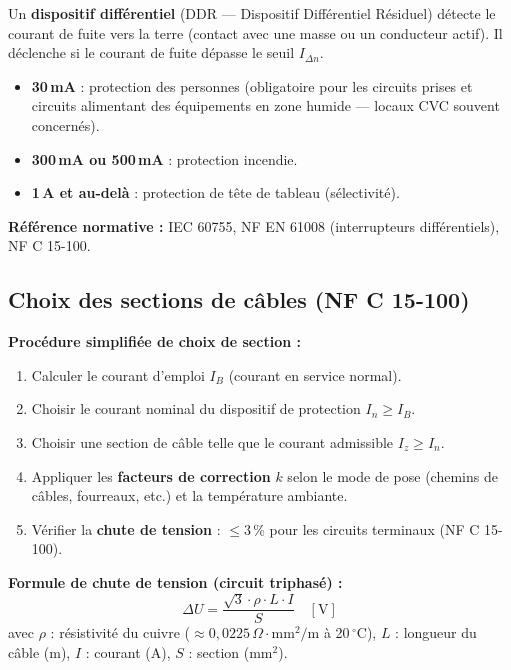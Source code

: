 \begin{definition}
  Un \textbf{dispositif différentiel} (DDR — Dispositif Différentiel Résiduel) détecte le courant de fuite vers la terre (contact avec une masse ou un conducteur actif). Il déclenche si le courant de fuite dépasse le seuil $I_{\Delta n}$.

  \begin{itemize}
    \item \textbf{30\,mA} : protection des personnes (obligatoire pour les circuits prises et circuits alimentant des équipements en zone humide — locaux CVC souvent concernés).
    \item \textbf{300\,mA ou 500\,mA} : protection incendie.
    \item \textbf{1\,A et au-delà} : protection de tête de tableau (sélectivité).
  \end{itemize}

  \textbf{Référence normative :} IEC 60755, NF EN 61008 (interrupteurs différentiels), NF C 15-100.
\end{definition}

\subsection{Choix des sections de câbles (NF C 15-100)}

\begin{methode}
  \textbf{Procédure simplifiée de choix de section :}
  \begin{enumerate}
    \item Calculer le courant d'emploi $I_B$ (courant en service normal).
    \item Choisir le courant nominal du dispositif de protection $I_n \geq I_B$.
    \item Choisir une section de câble telle que le courant admissible $I_z \geq I_n$.
    \item Appliquer les \textbf{facteurs de correction} $k$ selon le mode de pose (chemins de câbles, fourreaux, etc.) et la température ambiante.
    \item Vérifier la \textbf{chute de tension} : $\leq 3\,\%$ pour les circuits terminaux (NF C 15-100).
  \end{enumerate}

  \textbf{Formule de chute de tension (circuit triphasé) :}
  \begin{equation}
    \Delta U = \frac{\sqrt{3} \cdot \rho \cdot L \cdot I}{S} \quad [\text{V}]
  \end{equation}
  avec $\rho$ : résistivité du cuivre ($\approx 0{,}0225\,\Omega\cdot\text{mm}^2/\text{m}$ à 20\,$^\circ$C), $L$ : longueur du câble (m), $I$ : courant (A), $S$ : section (mm$^2$).
\end{methode}

